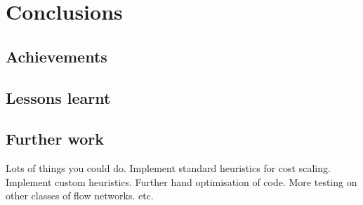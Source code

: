 \chapter{Conclusions}


\section{Achievements}

\section{Lessons learnt}

\section{Further work}

Lots of things you could do. Implement standard heuristics for cost scaling. Implement custom heuristics. Further hand optimisation of code. More testing on other classes of flow networks. etc.